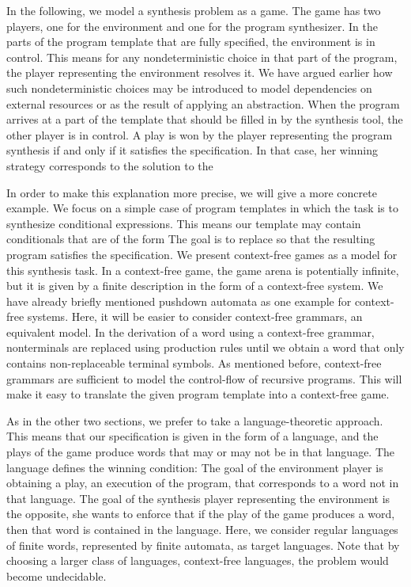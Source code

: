 \documentclass[../../diss.tex]{subfiles}
\begin{document}
In the following, we model a synthesis problem as a game.
The game has two players, one for the environment and one for the program synthesizer.
In the parts of the program template that are fully specified, the environment is in control.
This means for any nondeterministic choice in that part of the program, the player representing the environment resolves it.
We have argued earlier how such nondeterministic choices may be introduced to model dependencies on external resources or as the result of applying an abstraction.
When the program arrives at a part of the template that should be filled in by the synthesis tool, the other player is in control.
A play is won by the player representing the program synthesis if and only if it satisfies the specification.
In that case, her winning strategy corresponds to the solution to the 

In order to make this explanation more precise, we will give a more concrete example.
We focus on a simple case of program templates in which the task is to synthesize conditional expressions.
This means our template may contain conditionals that are of the form 
The goal is to replace  so that the resulting program satisfies the specification.
We present context-free games as a model for this synthesis task.
In a context-free game, the game arena is potentially infinite, but it is given by a finite description in the form of a context-free system.
We have already briefly mentioned pushdown automata as one example for context-free systems.
Here, it will be easier to consider context-free grammars, an equivalent model.
In the derivation of a word using a context-free grammar, nonterminals are replaced using production rules until we obtain a word that only contains non-replaceable terminal symbols.
As mentioned before, context-free grammars are sufficient to model the control-flow of recursive programs.
This will make it easy to translate the given program template into a context-free game.

As in the other two sections, we prefer to take a language-theoretic approach.
This means that our specification is given in the form of a language,
and the plays of the game produce words that may or may not be in that language.
The language defines the winning condition:
The goal of the environment player is obtaining a play, \ie an execution of the program, that corresponds to a word not in that language.
The goal of the synthesis player representing the environment is the opposite, she wants to enforce that if the play of the game produces a word, then that word is contained in the language.
Here, we consider regular languages of finite words, represented by finite automata, as target languages.
Note that by choosing a larger class of languages, \eg context-free languages, the problem would become undecidable.
\end{document}
